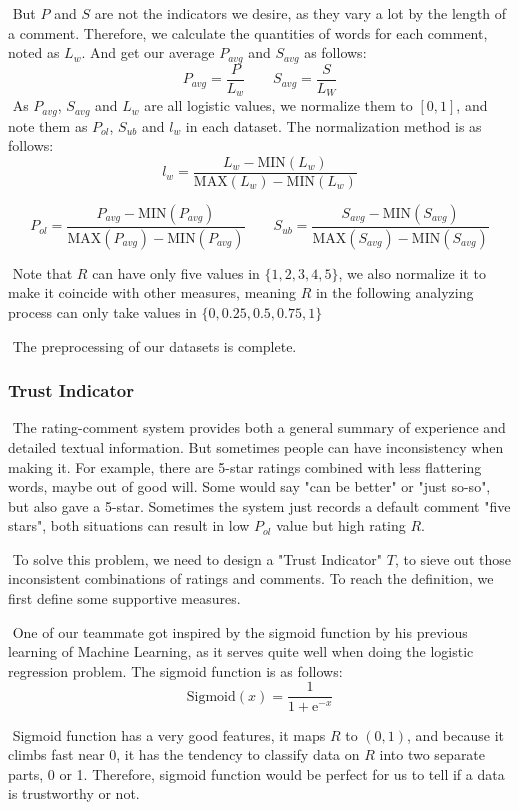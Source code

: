\documentclass[12pt]{article}  %
\begin{document}
​		But $P$ and $S$ are not the indicators we desire, as they vary a lot by the length of a comment. Therefore, we calculate the quantities of words for each comment, noted as $L_{w}$. And get our average $P_{avg}$ and $S_{avg}$ as follows:
$$
P_{avg} = \frac{P}{L_{w}}
\quad\quad
S_{avg} = \frac{S}{L_{W}}
$$
​		As  $P_{avg}$, $S_{avg}$ and $L_{w}$ are all logistic values, we normalize them to $[0,1]$, and note them as $P_{ol}$,  $S_{ub}$ and $l_{w}$ in each dataset. The normalization method is as follows:
$$
l_{w} = \frac{L_{w} - \mathrm{MIN}(L_{w})}{\mathrm{MAX}(L_{w}) - \mathrm{MIN}(L_{w})}
$$

$$
P_{ol} = \frac{P_{avg} - \mathrm{MIN}(P_{avg})}{\mathrm{MAX}(P_{avg}) - \mathrm{MIN}(P_{avg})}
\quad\quad
S_{ub} = \frac{S_{avg} - \mathrm{MIN}(S_{avg})}{\mathrm{MAX}(S_{avg}) - \mathrm{MIN}(S_{avg})}
$$

​		Note that $R$ can have only five values in $\{1,2,3,4,5\}$, we also normalize it to make it coincide with other measures, meaning $R$ in the following analyzing process can only take values in $\{0,0.25,0.5,0.75,1\}$

​		The preprocessing of our datasets is complete.

\subsubsection{Trust Indicator}

​		The rating-comment system provides both a general summary of experience and detailed textual information. But sometimes people can have inconsistency when making it. For example, there are 5-star ratings combined with less flattering words, maybe out of good will. Some would say "can be better" or "just so-so", but also gave a 5-star. Sometimes the system just records a default comment "five stars", both situations can result in low $P_{ol}$ value but high rating $R$.

​		To solve this problem, we need to design a "Trust Indicator" $T$, to sieve out those inconsistent combinations of ratings and comments. To reach the definition, we first define some supportive measures.

​		One of our teammate got inspired by the sigmoid function by his previous learning of Machine Learning, as it serves quite well when doing the logistic regression problem. The sigmoid function is as follows:
$$
\mathrm{Sigmoid}(x) = \frac{1}{1+\mathrm{e}^{-x}}
$$


​		Sigmoid function has a very good features, it maps $R$ to $(0,1)$, and because it climbs fast near 0, it has the tendency to classify data on $R$ into two separate parts, 0 or 1. Therefore, sigmoid function would be perfect for us to tell if a data is trustworthy or not.
\end{document}

